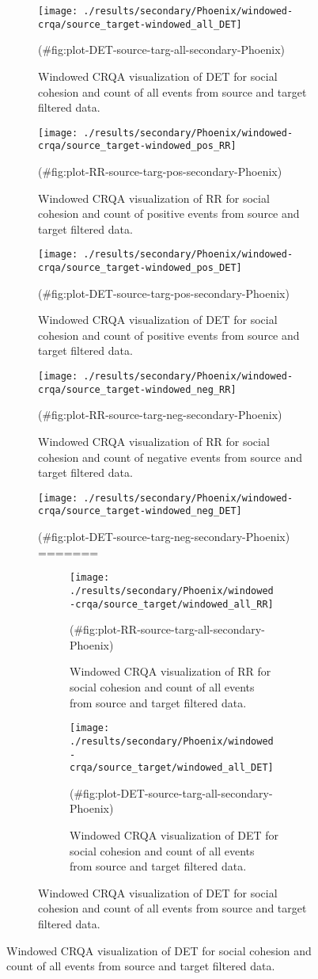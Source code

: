 \begin{appendix}
\begin{figure}
\begin{figure}
\texttt{[image: ./results/secondary/Phoenix/windowed-crqa/source\_target-windowed\_all\_DET]} \caption{Windowed CRQA visualization of DET for social cohesion and count of all events from source and target filtered data.}(\#fig:plot-DET-source-targ-all-secondary-Phoenix)
\end{figure}

\begin{figure}
\texttt{[image: ./results/secondary/Phoenix/windowed-crqa/source\_target-windowed\_pos\_RR]} \caption{Windowed CRQA visualization of RR for social cohesion and count of positive events from source and target filtered data.}(\#fig:plot-RR-source-targ-pos-secondary-Phoenix)
\end{figure}

\begin{figure}
\texttt{[image: ./results/secondary/Phoenix/windowed-crqa/source\_target-windowed\_pos\_DET]} \caption{Windowed CRQA visualization of DET for social cohesion and count of positive events from source and target filtered data.}(\#fig:plot-DET-source-targ-pos-secondary-Phoenix)
\end{figure}

\begin{figure}
\texttt{[image: ./results/secondary/Phoenix/windowed-crqa/source\_target-windowed\_neg\_RR]} \caption{Windowed CRQA visualization of RR for social cohesion and count of negative events from source and target filtered data.}(\#fig:plot-RR-source-targ-neg-secondary-Phoenix)
\end{figure}

\begin{figure}
\texttt{[image: ./results/secondary/Phoenix/windowed-crqa/source\_target-windowed\_neg\_DET]} \caption{Windowed CRQA visualization of DET for social cohesion and count of negative events from source and target filtered data.}(\#fig:plot-DET-source-targ-neg-secondary-Phoenix)
=======
\begin{figure}[!h]
\texttt{[image: ./results/secondary/Phoenix/windowed-crqa/source\_target/windowed\_all\_RR]} \caption{Windowed CRQA visualization of RR for social cohesion and count of all events from source and target filtered data.}(\#fig:plot-RR-source-targ-all-secondary-Phoenix)
\end{figure}

\begin{figure}[!h]
\texttt{[image: ./results/secondary/Phoenix/windowed-crqa/source\_target/windowed\_all\_DET]} \caption{Windowed CRQA visualization of DET for social cohesion and count of all events from source and target filtered data.}(\#fig:plot-DET-source-targ-all-secondary-Phoenix)
\end{figure}


\end{figure}
\end{figure}
\end{appendix}
